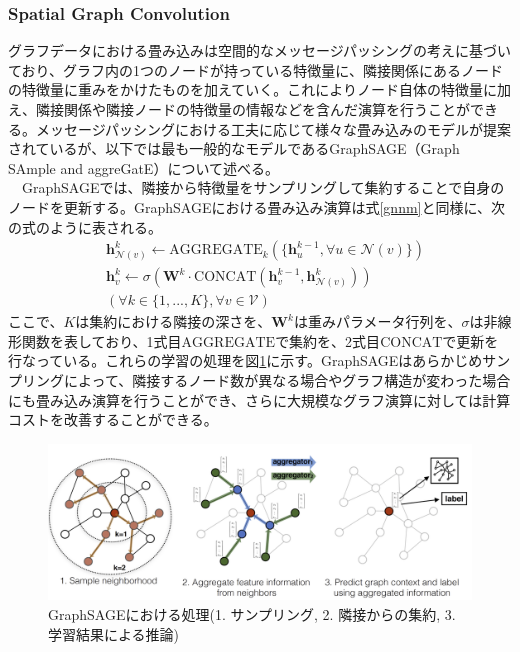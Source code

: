 \subsubsection{Spatial Graph Convolution}
グラフデータにおける畳み込みは空間的なメッセージパッシングの考えに基づいており、グラフ内の1つのノードが持っている特徴量に、隣接関係にあるノードの特徴量に重みをかけたものを加えていく。これによりノード自体の特徴量に加え、隣接関係や隣接ノードの特徴量の情報などを含んだ演算を行うことができる。メッセージパッシングにおける工夫に応じて様々な畳み込みのモデルが提案されているが、以下では最も一般的なモデルであるGraphSAGE（Graph SAmple and aggreGatE）\cite{graphsage}について述べる。\\
　GraphSAGEでは、隣接から特徴量をサンプリングして集約することで自身のノードを更新する。GraphSAGEにおける畳み込み演算は式\ref{gnnm}と同様に、次の式のように表される。\\
\begin{align}
&\bm{h}_{\mathcal{N}(v)}^k \leftarrow \mathrm{AGGREGATE}_k(\{ \bm{h}_u^{k-1}, \forall u \in \mathcal{N}(v) \})\\
&\bm{h}_v^k \leftarrow \sigma (\bm{W}^k \cdot \mathrm{CONCAT}(\bm{h}_v^{k-1}, \bm{h}_{\mathcal{N}(v)}^k))\\
&  (\forall k \in \{1, ..., K\}, \forall v \in \mathcal{V}) \nonumber
\end{align}
ここで、$K$は集約における隣接の深さを、$\bm{W}^k$は重みパラメータ行列を、$\sigma$は非線形関数を表しており、1式目$\mathrm{AGGREGATE}$で集約を、2式目$\mathrm{CONCAT}$で更新を行なっている。これらの学習の処理を図\ref{sage}に示す。GraphSAGEはあらかじめサンプリングによって、隣接するノード数が異なる場合やグラフ構造が変わった場合にも畳み込み演算を行うことができ、さらに大規模なグラフ演算に対しては計算コストを改善することができる。
\begin{figure}[H]
	\begin{center}
 \includegraphics[keepaspectratio, scale=0.3]
 	{Figure/Deeplearning/sage.png}
 		\caption{GraphSAGEにおける処理(1. サンプリング, 2. 隣接からの集約, 3. 学習結果による推論)}
 		\label{sage}
	\end{center}
\end{figure}
